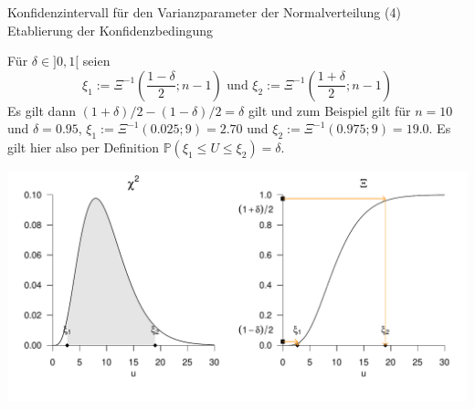\documentclass[
  8pt,
  ignorenonframetext,
]{beamer}
\begin{document}
\begin{frame}{Konfidenzintervall für den Varianzparameter der
Normalverteilung}
\protect\hypertarget{konfidenzintervall-fuxfcr-den-varianzparameter-der-normalverteilung-3}{}
\noindent (4) Etablierung der Konfidenzbedingung

\small

Für \(\delta \in ]0,1[\) seien \begin{equation}
\xi_1 := \Xi^{-1}\left(\frac{1 - \delta}{2}; n -1  \right)
\mbox{ und }
\xi_2 := \Xi^{-1}\left(\frac{1 + \delta}{2};n-1 \right)
\end{equation} Es gilt dann \((1 + \delta)/2 - (1 - \delta)/2 = \delta\)
gilt und zum Beispiel gilt für \(n = 10\) und \(\delta = 0.95\),
\(\xi_1 := \Xi^{-1}\left(0.025;9 \right) = 2.70\) und
\(\xi_2 := \Xi^{-1}\left(0.975; 9 \right) = 19.0\). Es gilt hier also
per Definition
\(\mathbb{P}\left(\xi_1 \le U \le \xi_2 \right) = \delta\).

\vspace{2mm}

\begin{center}\includegraphics[width=0.8\linewidth]{11_Abbildungen/wtfi_11_ki_u_konfidenzbedingung} \end{center}
\end{frame}
\end{document}
